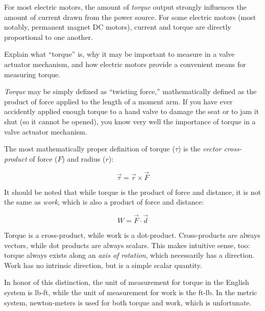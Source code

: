 

For most electric motors, the amount of {\it torque} output strongly influences the amount of current drawn from the power source.  For some electric motors (most notably, permanent magnet DC motors), current and torque are directly proportional to one another.

Explain what ``torque'' is, why it may be important to measure in a valve actuator mechanism, and how electric motors provide a convenient means for measuring torque.







{\it Torque} may be simply defined as ``twisting force,'' mathematically defined as the product of force applied to the length of a moment arm.  If you have ever accidently applied enough torque to a hand valve to damage the seat or to jam it shut (so it cannot be opened), you know very well the importance of torque in a valve actuator mechanism.
 
\vskip 10pt

The most mathematically proper definition of torque ($\tau$) is the {\it vector cross-product} of force ($F$) and radius ($r$):

$$\vec \tau = \vec r \times \vec F$$







It should be noted that while torque is the product of force and distance, it is not the same as {\it work}, which is also a product of force and distance:

$$W = \vec F \cdot \vec d$$

Torque is a cross-product, while work is a dot-product.  Cross-products are always vectors, while dot products are always scalars.  This makes intuitive sense, too: torque always exists along an {\it axis of rotation}, which necessarily has a direction.  Work has no intrinsic direction, but is a simple scalar quantity.

In honor of this distinction, the unit of measurement for torque in the English system is lb-ft, while the unit of measurement for work is the ft-lb.  In the metric system, newton-meters is used for both torque and work, which is unfortunate.




